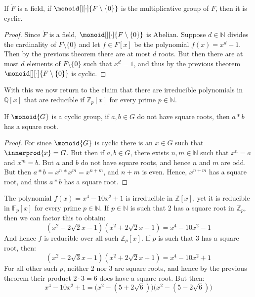     \begin{theorem}
        If $\ring{F}$ is a field, if $\monoid[][\cdot]{F\setminus\{0\}}$ is
        the multiplicative group of $F$, then it is cyclic.
    \end{theorem}
    \begin{proof}
        Since $\ring{F}$ is a field, $\monoid[][\cdot]{F\setminus\{0\}}$ is
        Abelian. Suppose $d\in\mathbb{N}$ divides the cardinality of
        $F\setminus\{0\}$ and let $f\in{F}[x]$ be the polynomial
        $f(x)=x^{d}-1$. Then by the previous theorem there are at most
        $d$ roots. But then there are at most $d$ elements of
        $F\setminus\{0\}$ such that $x^{d}=1$, and thus by the previous
        theorem $\monoid[][\cdot]{F\setminus\{0\}}$ is cyclic.
    \end{proof}
    With this we now return to the claim that there are irreducible
    polynomials in $\mathbb{Q}[x]$ that are reducible if $\mathbb{Z}_{p}[x]$
    for every prime $p\in\mathbb{N}$.
    \begin{theorem}
        If $\monoid{G}$ is a cyclic group, if $a,b\in{G}$ do not have
        square roots, then $a*b$ has a square root.
    \end{theorem}
    \begin{proof}
        For since $\monoid{G}$ is cyclic there is an $x\in{G}$ such that
        $\innerprod{x}=G$. But then if $a,b\in{G}$, there exists
        $n,m\in\mathbb{N}$ such that $x^{n}=a$ and $x^{m}=b$. But $a$ and
        $b$ do not have square roots, and hence $n$ and $m$ are odd. But
        then $a*b=x^{n}*x^{m}=x^{n+m}$, and $n+m$ is even. Hence,
        $x^{n+m}$ has a square root, and thus $a*b$ has a square root.
    \end{proof}
    \begin{example}
        The polynomial $f(x)=x^{4}-10x^{2}+1$ is irreducible in
        $\mathbb{Z}[x]$, yet it is reducible in $\mathbb{F}_{p}[x]$ for
        every prime $p\in\mathbb{N}$. If $p\in\mathbb{N}$ is such that
        2 has a square root in $\mathbb{Z}_{p}$, then we can factor this
        to obtain:
        \begin{equation}
            (x^{2}-2\sqrt{2}x-1)(x^{2}+2\sqrt{2}x-1)
            =x^{4}-10x^{2}-1
        \end{equation}
        And hence $f$ is reducible over all such $\mathbb{Z}_{p}[x]$. If $p$
        is such that 3 has a square root, then:
        \begin{equation}
            (x^{2}-2\sqrt{3}x-1)(x^{2}+2\sqrt{2}x+1)
            =x^{4}-10x^{2}+1
        \end{equation}
        For all other such $p$, neither 2 nor 3 are square roots, and hence
        by the previous theorem their product $2\cdot{3}=6$ does have a
        square root. But then:
        \begin{equation}
            x^{4}-10x^{2}+1=
                \big(x^{2}-(5+2\sqrt{6})\big)\big(x^{2}-(5-2\sqrt{6})\big)
        \end{equation}
    \end{example}
